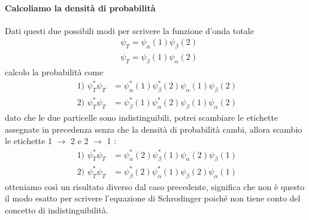 \paragraph{Calcoliamo la densità di probabilità}
Dati questi due possibili modi per scrivere la funzione d'onda totale
\begin{equation}
\begin{split}
& \psi_T = \psi_\alpha(1) \psi_\beta(2) \\
& \psi_T = \psi_\beta(1) \psi_\alpha(2)
\end{split}
\end{equation}
calcolo la probabilità come
\begin{equation}
\begin{split}
\mbox{ 1) } \psi^{\ast}_T\psi_T & = \psi_\alpha^\ast(1) \psi_\beta^\ast(2) \psi_\alpha(1) \psi_\beta(2) \\
\mbox{ 2) } \psi^{\ast}_T\psi_T & = \psi_\beta^\ast(1) \psi_\alpha^\ast(2) \psi_\beta(1) \psi_\alpha(2) 
\end{split}
\end{equation}
dato che le due particelle sono indistinguibili, potrei scambiare le etichette assegnate in precedenza senza che la densità di probabilità cambi, allora scambio le etichette 1 $\to$ 2 e 2 $\to$ 1 :
\begin{equation}
\begin{split}
\mbox{ 1) } \psi^{\ast}_T\psi_T & = \psi_\alpha^\ast(2) \psi_\beta^\ast(1) \psi_\alpha(2) \psi_\beta(1) \\
\mbox{ 2) } \psi^{\ast}_T\psi_T & = \psi_\beta^\ast(2) \psi_\alpha^\ast(1) \psi_\beta(2) \psi_\alpha(1) 
\end{split}
\end{equation}
otteniamo così un risultato diverso dal caso precedente, significa che non è questo il modo esatto per scrivere l'equazione di Schrodinger poiché non tiene conto del concetto di indistinguibilità.

